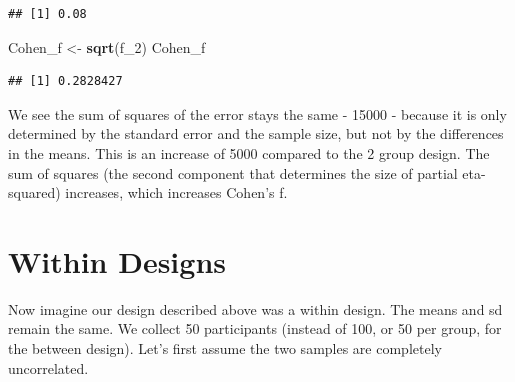 \documentclass[]{book}
\newenvironment{Shaded}{\begin{snugshade}}{\end{snugshade}}
\newcommand{\CommentTok}[1]{\textcolor[rgb]{0.56,0.35,0.01}{\textit{#1}}}
\newcommand{\DataTypeTok}[1]{\textcolor[rgb]{0.13,0.29,0.53}{#1}}
\newcommand{\DecValTok}[1]{\textcolor[rgb]{0.00,0.00,0.81}{#1}}
\newcommand{\KeywordTok}[1]{\textcolor[rgb]{0.13,0.29,0.53}{\textbf{#1}}}
\newcommand{\NormalTok}[1]{#1}
\newcommand{\OperatorTok}[1]{\textcolor[rgb]{0.81,0.36,0.00}{\textbf{#1}}}
\newcommand{\StringTok}[1]{\textcolor[rgb]{0.31,0.60,0.02}{#1}}
\begin{document}
\begin{verbatim}
## [1] 0.08
\end{verbatim}

\begin{Shaded}
\begin{Highlighting}[]
\NormalTok{Cohen_f <-}\StringTok{ }\KeywordTok{sqrt}\NormalTok{(f_}\DecValTok{2}\NormalTok{)}
\NormalTok{Cohen_f}
\end{Highlighting}
\end{Shaded}

\begin{verbatim}
## [1] 0.2828427
\end{verbatim}

We see the sum of squares of the error stays the same - 15000 - because it is only determined by the standard error and the sample size, but not by the differences in the means. This is an increase of 5000 compared to the 2 group design. The sum of squares (the second component that determines the size of partial eta-squared) increases, which increases Cohen's f.~

\hypertarget{within-designs}{%
\section{Within Designs}\label{within-designs}}

Now imagine our design described above was a within design. The means and sd remain the same. We collect 50 participants (instead of 100, or 50 per group, for the between design). Let's first assume the two samples are completely uncorrelated.

\begin{Shaded}
\end{Shaded}
\end{document}
